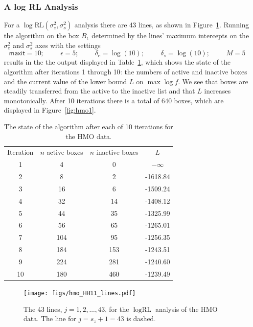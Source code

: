 \documentclass{report}
\newcommand{\textcompute}{\textsf}
\newcommand{\RLorig}{\text{RL}}
\newcommand{\logRLorig}{\log\RLorig}
\newcommand{\sigssq}{\sigma_s^2}
\newcommand{\sigesq}{\sigma_e^2}
\newcommand{\logRLssorig}{\logRLorig(\sigesq,\sigssq)}
\newcommand{\maxit}{\textcompute{maxit}}
\begin{document}
\subsubsection{A log RL Analysis}
For a $\logRLssorig$ analysis there are 43 lines, as shown in Figure~\ref{fig:hmolines}.
Running the algorithm on the box $B_1$ determined by the lines' maximum intercepts on the $\sigesq$ and $\sigssq$ axes with the settings
\begin{equation*}
	\maxit=10; \hspace{1cm} \epsilon=5; \hspace{1cm}
	\delta_e=\log(10); \hspace{1cm} \delta_s=\log(10); \hspace{1cm} M=5
\end{equation*}
results in the the output displayed in Table~\ref{table:hmo_HH11_run}, which shows the state of the algorithm after iterations 1 through 10: the numbers of active and inactive boxes and the current value of the lower bound $L$ on $\max\log f$.  We see that boxes are steadily transferred from the active to the inactive list and that $L$ increases monotonically.  After 10 iterations there is a total of 640 boxes, which are displayed in Figure~\ref{fig:hmo1}.

\begin{table}[h]
\centering
\begin{tabular}{|c|c|c|c|}
\hline
Iteration & $n$ active boxes & $n$ inactive boxes & $L$\\
1 & 4 & 0 & $-\infty$\\
2 & 8 & 2 & -1618.84\\
3 & 16 & 6 & -1509.24\\
4 & 32 & 14 & -1408.12\\
5 & 44 & 35 & -1325.99\\
6 & 56 & 65 & -1265.01\\
7 & 104 & 95 & -1256.35\\
8 & 184 & 153 & -1243.51\\
9 & 224 & 281 & -1240.60\\
10 & 180 & 460 & -1239.49\\
\hline
\end{tabular}
\caption{The state of the algorithm after each of 10 iterations for the HMO data.}
\label{table:hmo_HH11_run}
\end{table}

\begin{figure}
	\centering
	\texttt{[image: figs/hmo\_HH11\_lines.pdf]}
	\caption{The 43 lines, $j=1, 2, \dots, 43$, for the $\logRLorig$ analysis of the HMO data.
	              The line for $j = s_z+1 = 43$ is dashed.}
	\label{fig:hmolines}
\end{figure}
\end{document}
